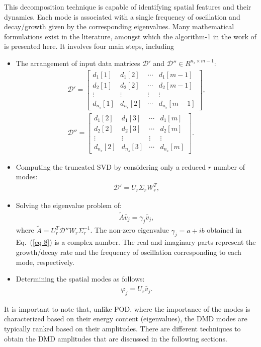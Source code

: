 \documentclass[a4paper,fleqn]{cas-sc}
\begin{document}
	This decomposition technique is capable of identifying spatial features and their dynamics. Each mode is associated with a single frequency of oscillation and decay/growth given by the corresponding eigenvalues. Many mathematical formulations exist in the literature, amongst which the algorithm-1 in the work of \citet{H.Tu2014} is presented here. It involves four main steps, including
	\begin{itemize}
		\item[1.] The arrangement of input data matrices $\mathcal{D}'$ and $\mathcal{D}''\in R^{n_{s}\times m-1}$:
		\begin{subequations}\label{eq 6}
			\begin{align}
				\mathcal{D}' = \begin{bmatrix}
					d_{1}[1] & d_{1}[2] & \cdots & d_{1}[m-1] \\
					d_{2}[1] & d_{2}[2] & \cdots & d_{2}[m-1] \\
					\vdots & \vdots & \vdots & \vdots \\
					d_{n_s}[1] & d_{n_s}[2] & \cdots & d_{n_s}[m-1]
				\end{bmatrix}, \label{eq 6a} \\
				\mathcal{D}'' = \begin{bmatrix}
					d_{1}[2] & d_{1}[3] & \cdots & d_{1}[m] \\
					d_{2}[2] & d_{2}[3] & \cdots & d_{2}[m] \\
					\vdots & \vdots & \vdots & \vdots \\
					d_{n_s}[2] & d_{n_s}[3] & \cdots & d_{n_s}[m]
				\end{bmatrix}.\label{eq 6b}
			\end{align}
		\end{subequations}
		\item[2.] Computing the truncated SVD by considering only a reduced $r$ number of modes:
		\begin{align}
			\mathcal{D}' = U_r\Sigma _r W_r^T, \label{eq 7}
		\end{align}
		\item[3.] Solving the eigenvalue problem of:
		\begin{align}
			\tilde{A} \tilde{v_j} = \gamma_j \tilde{v_j}, \label{eq 8}
		\end{align}
		where $\tilde{A}=U_r^T \mathcal{D}'' W_r \Sigma_r^{-1}$. The non-zero eigenvalue $\gamma_j= a + ib$ obtained in Eq.~(\ref{eq 8}) is a complex number. The real and imaginary parts represent the growth/decay rate and the frequency of oscillation corresponding to each mode, respectively.
		
		\item[4.] Determining the spatial modes as follows:
		\begin{align}
			\varphi _j = U_r\tilde{v_j}. \label{eq 9}
		\end{align}
		
	\end{itemize}
	It is important to note that, unlike POD, where the importance of the modes is characterized based on their energy content (eigenvalues), the DMD modes are typically ranked based on their amplitudes. There are different techniques to obtain the DMD amplitudes that are discussed in the following sections.
	
\end{document}
